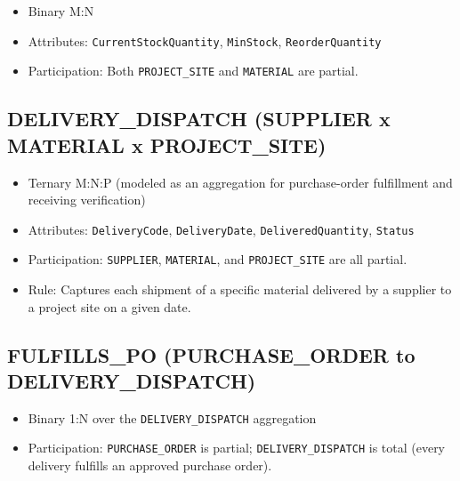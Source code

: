 \documentclass[a4paper,12pt]{report}
\providecommand{\tightlist}{%
  \setlength{\itemsep}{0pt}\setlength{\parskip}{0pt}}
\begin{document}
\begin{itemize}
\tightlist
\item
  Binary M:N
\item
  Attributes: \texttt{CurrentStockQuantity}, \texttt{MinStock}, \texttt{ReorderQuantity}
\item
  Participation: Both \texttt{PROJECT\_\allowbreak{}SITE} and \texttt{MATERIAL} are partial.
\end{itemize}

\subsection{\texorpdfstring{DELIVERY\texorpdfstring{\_\allowbreak{}}{_}DISPATCH (SUPPLIER x MATERIAL x PROJECT\texorpdfstring{\_\allowbreak{}}{_}SITE)}{DELIVERYDISPATCH (SUPPLIER x MATERIAL x PROJECTSITE)}}\label{delivery_dispatch-supplier-x-material-x-project_site}

\begin{itemize}
\tightlist
\item
  Ternary M:N:P (\allowbreak{}modeled as an aggregation for purchase-order fulfillment and receiving verification)
\item
  Attributes: \texttt{DeliveryCode}, \texttt{DeliveryDate}, \texttt{DeliveredQuantity}, \texttt{Status}
\item
  Participation: \texttt{SUPPLIER}, \texttt{MATERIAL}, and \texttt{PROJECT\_\allowbreak{}SITE} are all partial.
\item
  Rule: Captures each shipment of a specific material delivered by a supplier to a project site on a given date.
\end{itemize}

\subsection{\texorpdfstring{FULFILLS\texorpdfstring{\_\allowbreak{}}{_}PO (PURCHASE\texorpdfstring{\_\allowbreak{}}{_}ORDER to DELIVERY\texorpdfstring{\_\allowbreak{}}{_}DISPATCH)}{FULFILLSPO (PURCHASEORDER to DELIVERYDISPATCH)}}\label{fulfills_po-purchase_order-to-delivery_dispatch}

\begin{itemize}
\tightlist
\item
  Binary 1:N over the \texttt{DELIVERY\_\allowbreak{}DISPATCH} aggregation
\item
  Participation: \texttt{PURCHASE\_\allowbreak{}ORDER} is partial; \texttt{DELIVERY\_\allowbreak{}DISPATCH} is total (\allowbreak{}every delivery fulfills an approved purchase order).
\end{itemize}
\end{document}
